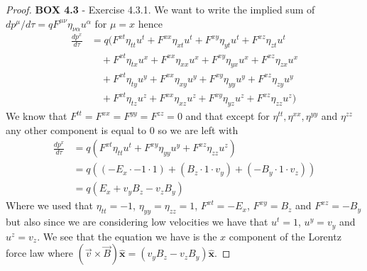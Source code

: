 \documentclass[11pt]{article}
\theoremstyle{definition}
\begin{document}
\cleardoublepage
\begin{proof}{\textbf{BOX 4.3} - Exercise 4.3.1.}
    We want to write the implied sum of
    $dp^\mu/d\tau = qF^{\mu\nu} \eta_{\nu\alpha}u^\alpha$
    for $\mu = x$ hence
    \begin{align*}
        \frac{dp^x}{d\tau} &=
        q(F^{xt} \eta_{tt}u^t + F^{xx} \eta_{xt}u^t
        + F^{xy} \eta_{yt}u^t + F^{xz} \eta_{zt}u^t\\
        &\quad+ F^{xt} \eta_{tx}u^x + F^{xx} \eta_{xx}u^x
        + F^{xy} \eta_{yx}u^x + F^{xz} \eta_{zx}u^x\\
        &\quad+ F^{xt} \eta_{ty}u^y + F^{xx} \eta_{xy}u^y
        + F^{xy} \eta_{yy}u^y + F^{xz} \eta_{zy}u^y\\
        &\quad+ F^{xt} \eta_{tz}u^z + F^{xx} \eta_{xz}u^z
        + F^{xy} \eta_{yz}u^z + F^{xz} \eta_{zz}u^z)
    \end{align*}
    We know that $F^{tt} = F^{xx} = F^{yy} = F^{zz} = 0$ and that
    except for $\eta^{tt}, \eta^{xx}, \eta^{yy}$ and $\eta^{zz}$ any other
    component is equal to 0 so we are left with
    \begin{align*}
        \frac{dp^x}{d\tau} &=
        q(F^{xt} \eta_{tt}u^t + F^{xy} \eta_{yy}u^y + F^{xz} \eta_{zz}u^z)\\
        &= q((-E_x \cdot -1 \cdot 1) + (B_z \cdot 1 \cdot v_y)
        + (-B_y \cdot 1 \cdot v_z))\\
        &= q(E_x + v_yB_z  - v_zB_y)
    \end{align*}
    Where we used that $\eta_{tt} = -1$, $\eta_{yy} = \eta_{zz} = 1$,
    $F^{xt} = - E_x$, $F^{xy} = B_z$ and $F^{xz} = -B_y$ but also since we are
    considering low velocities we have that $u^t = 1$, $u^y = v_y$ and
    $u^z = v_z$. We see that the equation we have is the $x$ component of the
    Lorentz force law where
    $(\vec{v} \times \vec{B})\bm{\hat{x}} = (v_yB_z  - v_zB_y)\bm{\hat{x}}$.    
\end{proof}
\end{document}
